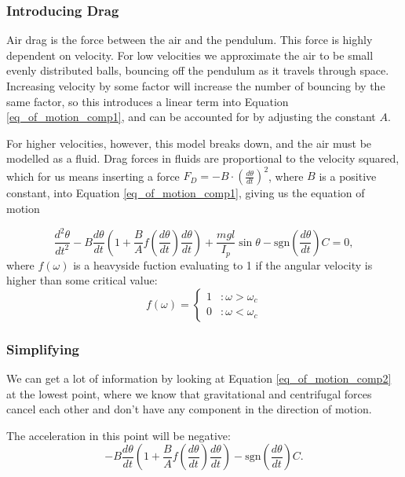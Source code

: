 ﻿\documentclass[11pt, a4paper]{article}
\begin{document}
\subsubsection{Introducing Drag}
Air drag is the force between the air and the pendulum. 
This force is highly dependent on velocity.
For low velocities we approximate the air to be small evenly distributed balls,
bouncing off the
pendulum as it travels through space. 
Increasing velocity by some factor will increase the number of bouncing by the same
factor, so this introduces a linear term into 
Equation \ref{eq_of_motion_comp1}, and can be accounted for by adjusting the constant
$A$.

For higher velocities, however, this model breaks down, and the air must be
modelled as a fluid. Drag forces in fluids are proportional to the velocity
squared\cite{drag}, which for us means inserting a force 
$F_D = -B\cdot \left(\frac{d\theta}{dt}\right)^2$, where $B$ is a positive constant,
into Equation \ref{eq_of_motion_comp1}, giving us the equation of motion

\begin{equation}
    \frac{d^2\theta}{dt^2} 
  - B \frac{d\theta}{dt}
  \left(1 + \frac{B}{A}f(\frac{d\theta}{dt}) \frac{d\theta}{dt} \right)  
  + \frac{mgl}{I_p}\sin{\theta} 
  - \text{sgn}\left(\frac{d\theta}{dt}\right)C
  = 0,
  \label{eq_of_motion_comp2}
\end{equation}
where $f(\omega)$ is a heavyside fuction evaluating to 1 if the angular
velocity is higher than some critical value:
\begin{equation}
f(\omega) = \left\{
  \begin{array}{lr}
    1 & : \omega > \omega_{c}\\
    0 & : \omega < \omega_{c}
  \end{array}
\right.
\end{equation}

\subsubsection{Simplifying}

We can get a lot of information by looking at Equation \ref{eq_of_motion_comp2}
at the lowest point, where we know that gravitational and centrifugal forces
cancel each other and don't have any component in the direction of motion.

The acceleration in this point will be negative:
\begin{equation}
  - B \frac{d\theta}{dt}
  \left(1 + \frac{B}{A}f(\frac{d\theta}{dt}) \frac{d\theta}{dt} \right)  
  - \text{sgn}\left(\frac{d\theta}{dt}\right)C.
\end{equation} 
\end{document}
